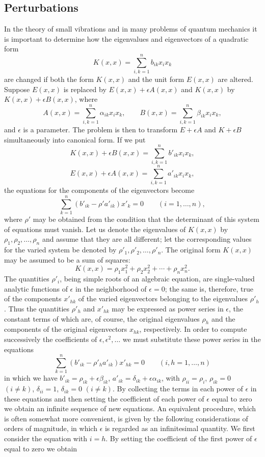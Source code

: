 \subsection{Perturbations}
In the theory of small vibrations and in many problems of quantum mechanics it is important to determine how the eigenvalues and eigenvectors of a quadratic form
\[
K(x,x)=\sum_{i,k=1}^{n}b_{ik}x_ix_k
\]
are changed if both the form $K(x,x)$ and the unit form $E(x,x)$ are altered. Suppose $E(x,x)$ is replaced by $E(x,x)+\epsilon A(x,x)$ and $K(x,x)$ by $K(x,x)+\epsilon B(x,x)$, where
\[
A(x,x)=\sum_{i,k=1}^{n}\alpha_{ik}x_ix_k,\qquad
B(x,x)=\sum_{i,k=1}^{n}\beta_{ik}x_ix_k,
\]
and $\epsilon$ is a parameter. The problem is then to transform $E+\epsilon A$ and $K+\epsilon B$ simultaneously into canonical form. If we put
\[
K(x,x)+\epsilon B(x,x)=\sum_{i,k=1}^{n}b'_{ik}x_ix_k,
\]
\[
E(x,x)+\epsilon A(x,x)=\sum_{i,k=1}^{n}a'_{ik}x_ix_k,
\]
the equations for the components of the eigenvectors become
\[
\sum_{k=1}^{n}(b'_{ik}-\rho' a'_{ik})x'_k=0\qquad(i=1,\ldots,n),
\]
where $\rho'$ may be obtained from the condition that the determinant of this system of equations must vanish. Let us denote the eigenvalues of $K(x,x)$ by $\rho_1,\rho_2,\ldots,\rho_n$ and assume that they are all different; let the corresponding values for the varied system be denoted by $\rho'_1,\rho'_2,\ldots,\rho'_n$. The original form $K(x,x)$ may be assumed to be a sum of squares:
\[
K(x,x)=\rho_1x_1^2+\rho_2x_2^2+\cdots+\rho_nx_n^2.
\]
The quantities $\rho'_i$, being simple roots of an algebraic equation, are single-valued analytic functions of $\epsilon$ in the neighborhood of $\epsilon=0$; the same is, therefore, true of the components $x'_{hk}$ of the varied eigenvectors belonging to the eigenvalues $\rho'_h$. Thus the quantities $\rho'_h$ and $x'_{hk}$ may be expressed as power series in $\epsilon$, the constant terms of which are, of course, the original eigenvalues $\rho_h$ and the components of the original eigenvectors $x_{hk}$, respectively. In order to compute successively the coefficients of $\epsilon,\epsilon^2,\ldots$ we must substitute these power series in the equations
\[
\sum_{k=1}^{n}(b'_{ik}-\rho'_h a'_{ik})x'_{hk}=0\qquad(i,h=1,\ldots,n)
\]
in which we have $b'_{ik}=\rho_{ik}+\epsilon\beta_{ik}$, $a'_{ik}=\delta_{ik}+\epsilon\alpha_{ik}$, with $\rho_{ii}=\rho_i$, $\rho_{ik}=0$ $(i\ne k)$, $\delta_{ii}=1$, $\delta_{ik}=0$ $(i\ne k)$. By collecting the terms in each power of $\epsilon$ in these equations and then setting the coefficient of each power of $\epsilon$ equal to zero we obtain an infinite sequence of new equations. An equivalent procedure, which is often somewhat more convenient, is given by the following considerations of orders of magnitude, in which $\epsilon$ is regarded as an infinitesimal quantity. We first consider the equation with $i=h$. By setting the coefficient of the first power of $\epsilon$ equal to zero we obtain
